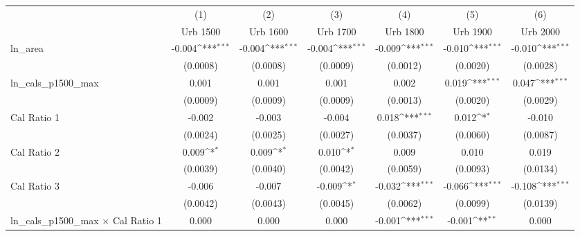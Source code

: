 {
\def\sym#1{\ifmmode^{#1}\else\(^{#1}\)\fi}
\begin{tabular}{l*{6}{c}}
\toprule
                    &\multicolumn{1}{c}{(1)}&\multicolumn{1}{c}{(2)}&\multicolumn{1}{c}{(3)}&\multicolumn{1}{c}{(4)}&\multicolumn{1}{c}{(5)}&\multicolumn{1}{c}{(6)}\\
                    &\multicolumn{1}{c}{Urb 1500}&\multicolumn{1}{c}{Urb 1600}&\multicolumn{1}{c}{Urb 1700}&\multicolumn{1}{c}{Urb 1800}&\multicolumn{1}{c}{Urb 1900}&\multicolumn{1}{c}{Urb 2000}\\
\midrule
ln\_area             &      -0.004\sym{***}&      -0.004\sym{***}&      -0.004\sym{***}&      -0.009\sym{***}&      -0.010\sym{***}&      -0.010\sym{***}\\
                    &    (0.0008)         &    (0.0008)         &    (0.0009)         &    (0.0012)         &    (0.0020)         &    (0.0028)         \\
\addlinespace
ln\_cals\_p1500\_max   &       0.001         &       0.001         &       0.001         &       0.002         &       0.019\sym{***}&       0.047\sym{***}\\
                    &    (0.0009)         &    (0.0009)         &    (0.0009)         &    (0.0013)         &    (0.0020)         &    (0.0029)         \\
\addlinespace
Cal Ratio 1         &      -0.002         &      -0.003         &      -0.004         &       0.018\sym{***}&       0.012\sym{*}  &      -0.010         \\
                    &    (0.0024)         &    (0.0025)         &    (0.0027)         &    (0.0037)         &    (0.0060)         &    (0.0087)         \\
\addlinespace
Cal Ratio 2         &       0.009\sym{*}  &       0.009\sym{*}  &       0.010\sym{*}  &       0.009         &       0.010         &       0.019         \\
                    &    (0.0039)         &    (0.0040)         &    (0.0042)         &    (0.0059)         &    (0.0093)         &    (0.0134)         \\
\addlinespace
Cal Ratio 3         &      -0.006         &      -0.007         &      -0.009\sym{*}  &      -0.032\sym{***}&      -0.066\sym{***}&      -0.108\sym{***}\\
                    &    (0.0042)         &    (0.0043)         &    (0.0045)         &    (0.0062)         &    (0.0099)         &    (0.0139)         \\
\addlinespace
ln\_cals\_p1500\_max $\times$ Cal Ratio 1&       0.000         &       0.000         &       0.000         &      -0.001\sym{***}&      -0.001\sym{**} &       0.000         \\

\end{tabular}}
